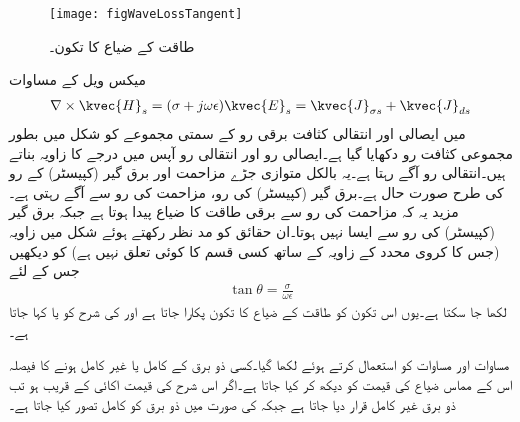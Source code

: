 \begin{figure}
\centering
\texttt{[image: figWaveLossTangent]}
\caption{طاقت کے ضیاع کا تکون۔}
\label{شکل_موج_ضیاع_کا_تکون}
\end{figure}

میکس ویل کے مساوات
\begin{align*}
\nabla \times \kvec{H}_s=(\sigma+j\omega \epsilon)\kvec{E}_s=\kvec{J}_{\sigma s}+\kvec{J}_{d s}
\end{align*}
میں ایصالی اور انتقالی کثافت برقی رو کے سمتی مجموعے کو شکل  میں بطور مجموعی کثافت رو  دکھایا گیا ہے۔ایصالی رو اور انتقالی رو آپس میں  درجے کا زاویہ بناتے ہیں۔انتقالی رو  آگے رہتا ہے۔یہ بالکل متوازی جڑے مزاحمت اور برق گیر (کپیسٹر)  کے رو کی طرح صورت حال ہے۔برق گیر (کپیسٹر)  کی رو، مزاحمت کی رو سے   آگے رہتی ہے۔مزید یہ کہ مزاحمت کی رو سے برقی طاقت  کا ضیاع پیدا ہوتا ہے جبکہ برق گیر (کپیسٹر)  کی رو سے ایسا نہیں ہوتا۔ان حقائق کو مد نظر رکھتے ہوئے  شکل  میں زاویہ  (جس کا کروی محدد کے زاویہ  کے ساتھ کسی قسم کا کوئی تعلق نہیں ہے) کو دیکھیں جس کے لئے
\begin{align}
\tan \theta=\frac{\sigma}{\omega \epsilon}
\end{align}
لکھا جا سکتا ہے۔یوں اس تکون کو طاقت کے ضیاع کا تکون پکارا جاتا ہے اور  کی شرح کو  یا کہا جاتا ہے۔

مساوات  اور مساوات  کو  استعمال کرتے ہوئے لکھا گیا۔کسی ذو برق کے کامل یا غیر کامل ہونے کا فیصلہ اس کے مماس ضیاع کی قیمت کو دیکھ کر کیا جاتا ہے۔اگر اس شرح کی قیمت اکائی کے قریب ہو تب ذو برق غیر کامل قرار دیا جاتا ہے جبکہ  کی صورت میں ذو برق کو کامل تصور کیا جاتا ہے۔

